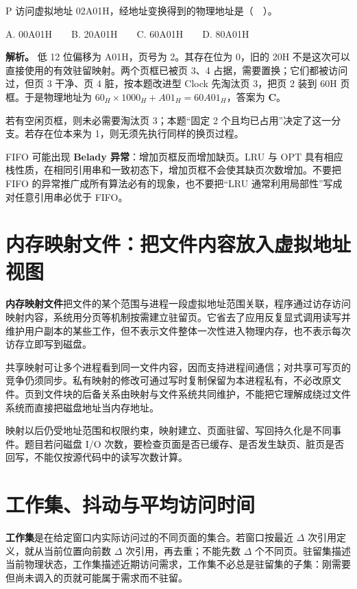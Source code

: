 P 访问虚拟地址 02A01H，经地址变换得到的物理地址是（　）。

A. 00A01H　　B. 20A01H　　C. 60A01H　　D. 80A01H


\textbf{解析。} 低 12 位偏移为 A01H，页号为 2。其存在位为 0，旧的 20H 不是这次可以直接使用的有效驻留映射。两个页框已被页 3、4 占据，需要置换；它们都被访问过，但页 3 干净、页 4 脏，按本题改进型 Clock 先淘汰页 3，把页 2 装到 60H 页框。于是物理地址为 \(60_H\times1000_H+A01_H=60A01_H\)，答案为 \textbf{C}。

若有空闲页框，则未必需要淘汰页 3；本题``固定 2 个且均已占用''决定了这一分支。若存在位本来为 1，则无须先执行同样的换页过程。

FIFO 可能出现 \textbf{Belady 异常}：增加页框反而增加缺页。LRU 与 OPT 具有相应栈性质，在相同引用串和一致初态下，增加页框不会使其缺页次数增加。不要把 FIFO 的异常推广成所有算法必有的现象，也不要把``LRU 通常利用局部性''写成对任意引用串必优于 FIFO。

\section{内存映射文件：把文件内容放入虚拟地址视图}\label{os-5-10}

\textbf{内存映射文件}把文件的某个范围与进程一段虚拟地址范围关联，程序通过访存访问映射内容，系统用分页等机制按需建立驻留页。它省去了应用反复显式调用读写并维护用户副本的某些工作，但不表示文件整体一次性进入物理内存，也不表示每次访存立即写到磁盘。

共享映射可让多个进程看到同一文件内容，因而支持进程间通信；对共享可写页的竞争仍须同步。私有映射的修改可通过写时复制保留为本进程私有，不必改原文件。页到文件块的后备关系由映射与文件系统共同维护，不能把它理解成绕过文件系统而直接把磁盘地址当内存地址。

映射以后仍受地址范围和权限约束，映射建立、页面驻留、写回持久化是不同事件。题目若问磁盘 I/O 次数，要检查页面是否已缓存、是否发生缺页、脏页是否回写，不能仅按源代码中的读写次数计算。

\section{工作集、抖动与平均访问时间}\label{os-5-11}

\textbf{工作集}是在给定窗口内实际访问过的不同页面的集合。若窗口按最近 \(\Delta\) 次引用定义，就从当前位置向前数 \(\Delta\) 次引用，再去重；不能先数 \(\Delta\) 个不同页。驻留集描述当前物理状态，工作集描述近期访问需求，工作集不必总是驻留集的子集：刚需要但尚未调入的页就可能属于需求而不驻留。


